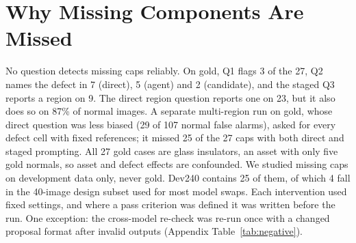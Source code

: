 \documentclass[11pt]{article}
\begin{document}
\section{Why Missing Components Are Missed}\label{sec:missing}
No question detects missing caps reliably. On gold, Q1 flags 3 of the 27, Q2 names the defect in 7 (direct), 5 (agent) and 2 (candidate), and the staged Q3 reports a region on 9. The direct region question reports one on 23, but it also does so on 87\% of normal images. A separate multi-region run on gold, whose direct question was less biased (29 of 107 normal false alarms), asked for every defect cell with fixed references; it missed 25 of the 27 caps with both direct and staged prompting. All 27 gold cases are glass insulators, an asset with only five gold normals, so asset and defect effects are confounded. We studied missing caps on development data only, never gold. Dev240 contains 25 of them, of which 4 fall in the 40-image design subset used for most model swaps. Each intervention used fixed settings, and where a pass criterion was defined it was written before the run. One exception: the cross-model re-check was re-run once with a changed proposal format after invalid outputs (Appendix Table~\ref{tab:negative}).
\end{document}

